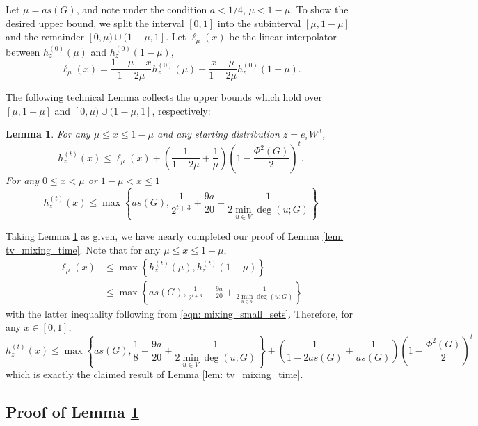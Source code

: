 \documentclass[11pt,twoside]{article}
\newtheorem{lemma}{Lemma}
\theoremstyle{definition}
\newcommand{\set}[1]{\left\{#1\right\}}
\newcommand{\1}{\mathbbm{1}}
\begin{document}
Let $\mu = as(G)$, and note under the condition $a < 1/4$, $\mu < 1 - \mu$. To show the desired upper bound, we split the interval $[0,1]$ into the subinterval $[\mu, 1 - \mu]$ and the remainder $[0,\mu) \cup (1 - \mu, 1]$. Let $\ell_{\mu}(x)$ be the linear interpolator between $h_z^{(0)}(\mu)$ and $h_z^{(0)}(1 - \mu)$, 
\begin{equation*}
\ell_{\mu}(x) = \frac{1 - \mu - x}{1 - 2\mu} h_z^{(0)}(\mu) + \frac{x - \mu}{1 - 2\mu}h_z^{(0)}(1 - \mu).
\end{equation*}

The following technical Lemma collects the upper bounds which hold over $[\mu, 1 - \mu]$ and $[0,\mu) \cup (1 - \mu, 1]$, respectively:
\begin{lemma}
	\label{lem: mixing_all_sets}
	For any $\mu \leq x \leq 1 - \mu$ and any starting distribution $z = e_vW^3$,
	\begin{equation}
	\label{eqn: mixing_large_sets}
	h_z^{(t)}(x) \leq \ell_{\mu}(x) + \left(\frac{1}{1 - 2\mu} + \frac{1}{\mu}\right)\left(1 - \frac{\Phi^2(G)}{2}\right)^t.
	\end{equation}
	For any $0 \leq x < \mu$ or $1 - \mu < x \leq 1$
	\begin{equation}
	\label{eqn: mixing_small_sets}
	h_z^{(t)}(x) \leq \max\set{as(G), \frac{1}{2^{t+3}} + \frac{9a}{20} + \frac{1}{2 \min_{u \in V}\deg(u;G)} }
	\end{equation}
\end{lemma}
\noindent Taking Lemma \ref{lem: mixing_all_sets} as given, we have nearly completed our proof of Lemma \ref{lem: tv_mixing_time}. Note that for any $\mu \leq x \leq 1 - \mu$,
\begin{align*}
\ell_{\mu}(x) & \leq \max\set{h_z^{(t)}(\mu),h_z^{(t)}(1 - \mu)} \\
& \leq \max\set{as(G), \frac{1}{2^{t + 3}} + \frac{9a}{20} + \frac{1}{2 \min_{u \in V}\deg(u;G)} }
\end{align*}
with the latter inequality following from \eqref{eqn: mixing_small_sets}. Therefore, for any $x \in [0,1]$,
\begin{equation*}
h_z^{(t)}(x) \leq \max\set{as(G), \frac{1}{8} + \frac{9a}{20} + \frac{1}{2 \min_{u \in V}\deg(u;G)} } + \left(\frac{1}{1 - 2as(G)} + \frac{1}{as(G)}\right)\left(1 - \frac{\Phi^2(G)}{2}\right)^t
\end{equation*}
which is exactly the claimed result of Lemma \ref{lem: tv_mixing_time}.

\subsection{Proof of Lemma \ref{lem: mixing_all_sets}}
\end{document}
